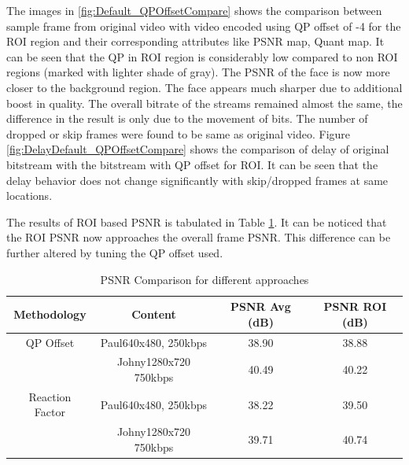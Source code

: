 \documentclass[11pt]{article} %
\begin{document}
The images in \ref{fig:Default_QPOffsetCompare} shows the comparison between sample frame from original video with video encoded using QP offset of -4 for the ROI region and their corresponding attributes like PSNR map, Quant map. It can be seen that the QP in ROI region is considerably low compared to non ROI regions (marked with lighter shade of gray). The PSNR of the face is now more closer to the background region. The face appears much sharper due to additional boost in quality. The overall bitrate of the streams remained almost the same, the difference in the result is only due to the movement of bits. The number of dropped or skip frames were found to be same as original video. Figure \ref{fig:DelayDefault_QPOffsetCompare} shows the comparison of delay of original bitstream with the bitstream with QP offset for ROI. It can be seen that the delay behavior does not change significantly with skip/dropped frames at same locations.

The results of ROI based PSNR is tabulated in Table \ref{AllPSNR1}. It can be noticed that the ROI PSNR now approaches the overall frame PSNR. This difference can be further altered by tuning the QP offset used.
\begin{table} [h!]
\centering
\begin{tabular}{ |c|c|c|c| }
 \hline
Methodology & Content & PSNR Avg (dB) & PSNR ROI (dB) \\
 \hline 
QP Offset & Paul640x480, 250kbps & 38.90 & 38.88 \\ 
 & Johny1280x720 750kbps & 40.49 & 40.22 \\  
 \hline
Reaction Factor & Paul640x480, 250kbps & 38.22 & 39.50 \\ 
 & Johny1280x720 750kbps & 39.71 & 40.74 \\  
 \hline
\end{tabular}
 \caption{PSNR Comparison for different approaches}
 \label{AllPSNR1}
\end{table}

%
\end{document}
